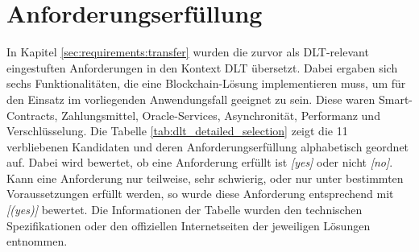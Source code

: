 %
%
\section{Anforderungserfüllung}
\label{sec:dlt_selection:fullfilment}
In Kapitel \ref{sec:requirements:transfer} wurden die zurvor als \ac{DLT}-relevant eingestuften Anforderungen in den Kontext \ac{DLT} übersetzt. Dabei ergaben sich sechs Funktionalitäten, die eine Blockchain-Lösung implementieren muss, um für den Einsatz im vorliegenden Anwendungsfall geeignet zu sein. Diese waren Smart-Contracts, Zahlungsmittel, Oracle-Services, Asynchronität, Performanz und Verschlüsselung. Die Tabelle \ref{tab:dlt_detailed_selection} zeigt die 11 verbliebenen Kandidaten und deren Anforderungserfüllung alphabetisch geordnet auf. Dabei wird bewertet, ob eine Anforderung erfüllt ist \textit{[yes]} oder nicht \textit{[no]}. Kann eine Anforderung nur teilweise, sehr schwierig, oder nur unter bestimmten Voraussetzungen erfüllt werden, so wurde diese Anforderung entsprechend mit \textit{[(yes)]} bewertet. Die Informationen der Tabelle wurden den technischen Spezifikationen oder den offiziellen Internetseiten der jeweiligen Lösungen entnommen.

